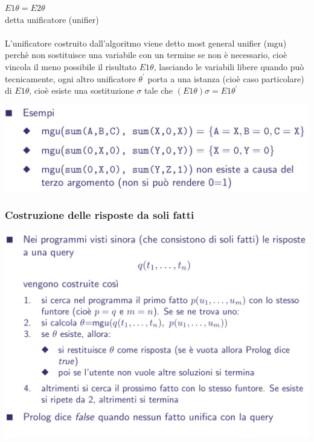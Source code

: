 \documentclass[10pt]{article}
\begin{document}
$E1\theta = E2\theta$
\\
detta unificatore (unifier)
\\\\
L’unificatore costruito dall’algoritmo viene detto most general
unifier (mgu) perchè non sostituisce una variabile con un termine se non è
necessario, cioè
vincola il meno possibile il risultato $E1\theta$, lasciando le variabili
libere quando può
tecnicamente, ogni altro unificatore $\theta^'$ porta a una istanza
(cioè caso particolare) di $E1\theta$, cioè
esiste una sostituzione $\sigma$ tale che $(E1\theta)\sigma = E1\theta^'$

\includegraphics[scale=0.2]{Immagini/prolog12.png}
\subsubsection{Costruzione delle risposte da soli fatti}
\includegraphics[scale=0.25]{Immagini/pl13.png}
\end{document}
